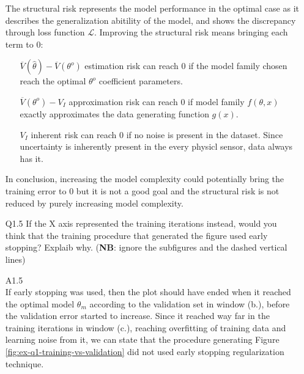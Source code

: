 \documentclass[unicode, 11pt, a4paper]{scrartcl}
\begin{document}
\begin{itemize}
	      The structural risk represents the model performance in the optimal case
	      as it describes the generalization abitility of the model,
	      and shows the discrepancy through loss function $\mathcal{L}$.
	      Improving the structural risk means bringing each term to 0:

	      \begin{itemize}
		      \item[] $\overline{V}(\hat{\theta}) - \overline{V}(\theta^o)$
		            estimation risk can reach 0 if the model family chosen reach the optimal $\theta^o$
		            coefficient parameters.

		      \item[] $\overline{V}(\theta^o) - V_I$ approximation risk can reach 0
		            if model family $f(\theta, x)$ exactly approximates the data generating function $g(x)$.

		      \item[] $V_I$ inherent risk can reach 0 if no noise is present in the dataset.
		            Since uncertainty is inherently present in the every physicl sensor, data always has it.
	      \end{itemize}
	      In conclusion, increasing the model complexity could potentially bring the training error to 0
	      but it is not a good goal
	      and the structural risk is not reduced by purely increasing model complexity.

	\item[Q1.5] If the X axis represented the training iterations instead,
	      would you think that the training procedure that generated the figure used early stopping?
	      Explaib why. (\textbf{NB}: ignore the subfigures and the dashed vertical lines)

	\item[A1.5] ~\\
	      If early stopping was used, then the plot should have ended when it reached the optimal model
	      $\theta_m$ according to the validation set in window (b.),
	      before the validation error started to increase.
	      Since it reached way far in the training iterations in window (c.),
	      reaching overfitting of training data and learning noise from it,
	      we can state that the procedure generating Figure \ref{fig:ex-q1-training-vs-validation}
	      did not used early stopping regularization technique.
\end{itemize}
\end{document}
